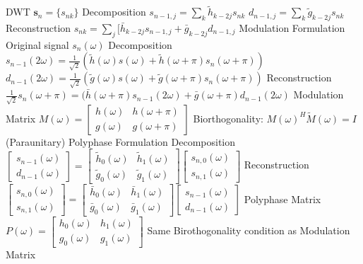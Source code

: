 \documentclass[14pt]{extarticle}
\begin{document}
\begin{outline}
			\2	DWT
				\3	$\mathbf{s}_n = \{s_{nk}\}$
				\3	Decomposition
					\4	$s_{n-1,j} = \sum_k \tilde{h}_{k - 2j} s_{nk}$
					\4	$d_{n-1,j} = \sum_k \tilde{g}_{k - 2j} s_{nk}$
				\3	Reconstruction
					\4	$s_{nk} = \sum_j [\bar{h}_{k - 2j} s_{n-1,j} + \bar{g}_{k-2j}d_{n-1,j}$
			\2	Modulation Formulation
				\3	Original signal $s_n(\omega)$
				\3	Decomposition
					\4	$s_{n-1}(2\omega) = \frac{1}{\sqrt{2}}(\tilde{h}(\omega)s(\omega) + 
								\tilde{h}(\omega + \pi) s_n(\omega + \pi))$
					\4	$d_{n-1}(2\omega) = \frac{1}{\sqrt{2}}(\tilde{g}(\omega)s(\omega) + 
								\tilde{g}(\omega + \pi) s_n(\omega + \pi))$
				\3	Reconstruction
					\4	$\frac{1}{\sqrt{2}}s_n(\omega + \pi) = (\bar{h}(\omega + \pi)s_{n-1}(2\omega) +
								\bar{g}(\omega + \pi) d_{n-1}(2\omega)$
				\3	Modulation Matrix
					\4	$M(\omega) = \begin{bmatrix}
															h(\omega) & h(\omega + \pi) \\
															g(\omega) & g(\omega + \pi)
														\end{bmatrix}$
					\4 Biorthogonality: $M(\omega)^H \tilde{M}(\omega) = I$ (Paraunitary)
			\2	Polyphase Formulation
				\3	Decomposition
					\4	$\begin{bmatrix} s_{n-1}(\omega) \\ d_{n-1}(\omega) \end{bmatrix}
								= \begin{bmatrix}
										\tilde{h}_0(\omega) & \tilde{h}_1(\omega) \\
										\tilde{g}_0(\omega) & \tilde{g}_1(\omega)
									\end{bmatrix}
									\begin{bmatrix}
										s_{n,0}(\omega) \\
										s_{n,1}(\omega)
									\end{bmatrix}$
				\3	Reconstruction
					\4$		\begin{bmatrix}
										s_{n,0}(\omega) \\
										s_{n,1}(\omega)
									\end{bmatrix} = 
									\begin{bmatrix}
										\bar{h}_0(\omega) & \bar{h}_1(\omega) \\
										\bar{g}_0(\omega) & \bar{g}_1(\omega)
									\end{bmatrix}		
								\begin{bmatrix} s_{n-1}(\omega) \\ d_{n-1}(\omega) \end{bmatrix}	
						$
				\3	Polyphase Matrix
					\4	$P(\omega) = \begin{bmatrix} 
								h_0(\omega) & h_1(\omega) \\
								g_0(\omega) & g_1(\omega)
							\end{bmatrix}$
					\4	Same Birothogonality condition as Modulation Matrix
	

\end{outline}
\end{document}

